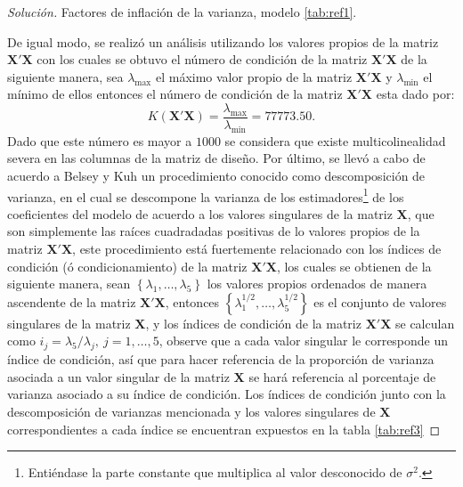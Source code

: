 \documentclass[10.5pt,notitlepage]{article}
\newenvironment{solucion}
  {\begin{proof}[Solución]}
  {\end{proof}}
\newcommand{\kis}[1]{\left\{ #1 \right\}}
\theoremstyle{plain}
\begin{document}
\begin{solucion}
\begin{table}[H]
        \caption{Factores de inflación de la varianza, modelo \ref{tab:ref1}.}
        \label{tab:ref2}
\end{table}
De igual modo, se realizó un análisis utilizando los valores propios de la matriz \(\mathbf{X}'\mathbf{X}\) con los cuales se obtuvo el número de condición de la matriz \(\mathbf{X}'\mathbf{X}\) de la siguiente manera, sea \(\lambda_{\max}\) el máximo valor propio de la matriz \(\mathbf{X}'\mathbf{X}\) y \(\lambda_{\min}\) el mínimo de ellos entonces el número de condición de la matriz \(\mathbf{X}'\mathbf{X}\) esta dado por:
\begin{equation}\label{condNum 1}
    K(\mathbf{X}'\mathbf{X}) = \frac{\lambda_{\max}}{\lambda_{\min}} =  77773.50.
\end{equation}
Dado que este número es mayor a \(1000\) se considera que existe multicolinealidad severa en las columnas de la matriz de diseño. Por último, se llevó a cabo de acuerdo a Belsey y Kuh un procedimiento conocido como descomposición de varianza, en el cual se descompone la varianza de los estimadores\footnote{Entiéndase la parte constante que multiplica al valor desconocido de \(\sigma^2\).} de los coeficientes del modelo de acuerdo a los valores singulares de la matriz \(\mathbf{X}\), que son simplemente las raíces cuadradadas positivas de lo valores propios de la matriz \(\mathbf{X}'\mathbf{X}\), este procedimiento está fuertemente relacionado con los índices de condición (ó condicionamiento) de la matriz \(\mathbf{X}'\mathbf{X}\), los cuales se obtienen de la siguiente manera, sean \(\kis{\lambda_1, \hdots, \lambda_5}\) los valores propios ordenados de manera ascendente de la matriz \(\mathbf{X}'\mathbf{X}\), entonces \(\kis{\lambda_{1}^{1/2}, \hdots, \lambda_{5}^{1/2}}\) es el conjunto de valores singulares de la matriz \(\mathbf{X}\), y los índices de condición de la matriz \(\mathbf{X}'\mathbf{X}\) se calculan como \(i_{j}=
\lambda_{5}/\lambda_{j}, \ j = 1,\hdots,5\), observe que a cada valor singular le corresponde un índice de condición, así que para hacer referencia de la proporción de varianza asociada a un valor singular de la matriz \(\mathbf{X}\) se hará referencia al porcentaje de varianza asociado a su índice de condición. Los índices de condición junto con la descomposición de varianzas mencionada y los valores singulares de \(\mathbf{X}\) correspondientes a cada índice se encuentran expuestos en la tabla \ref{tab:ref3} 
\begin{table}[H]
        \centering
{}
\end{table}
\end{solucion}
\end{document}
